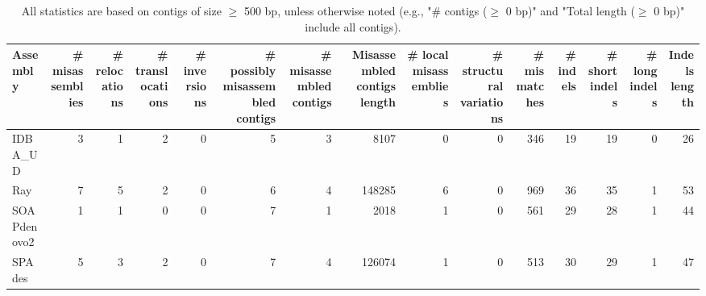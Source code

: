 \documentclass[12pt,a4paper]{article}
\begin{document}
\begin{table}[ht]
\begin{center}
\caption{All statistics are based on contigs of size $\geq$ 500 bp, unless otherwise noted (e.g., "\# contigs ($\geq$ 0 bp)" and "Total length ($\geq$ 0 bp)" include all contigs).}
\begin{tabular}{|l*{14}{|r}|}
\hline
Assembly & \# misassemblies &     \# relocations &     \# translocations &     \# inversions & \# possibly misassembled contigs & \# misassembled contigs & Misassembled contigs length & \# local misassemblies & \# structural variations & \# mismatches & \# indels &     \# short indels &     \# long indels & Indels length \\ \hline
IDBA\_UD & 3 & 1 & 2 & 0 & 5 & 3 & 8107 & 0 & 0 & 346 & 19 & 19 & 0 & 26 \\ \hline
Ray & 7 & 5 & 2 & 0 & 6 & 4 & 148285 & 6 & 0 & 969 & 36 & 35 & 1 & 53 \\ \hline
SOAPdenovo2 & 1 & 1 & 0 & 0 & 7 & 1 & 2018 & 1 & 0 & 561 & 29 & 28 & 1 & 44 \\ \hline
SPAdes & 5 & 3 & 2 & 0 & 7 & 4 & 126074 & 1 & 0 & 513 & 30 & 29 & 1 & 47 \\ \hline
\end{tabular}
\end{center}
\end{table}
\end{document}
